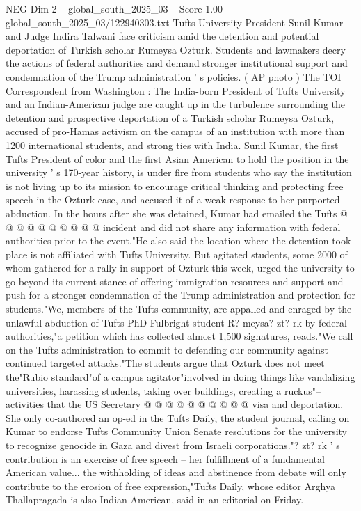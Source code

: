 \begin{textsample}{NEG Dim 2 – global\_south\_2025\_03 – Score 1.00 – global\_south\_2025\_03/122940303.txt}  \label{ex:f2_neg_140}
Tufts University President Sunil Kumar and Judge Indira Talwani face criticism amid the detention and potential deportation of Turkish scholar Rumeysa Ozturk.
Students and lawmakers decry the actions of federal authorities and demand stronger institutional support and condemnation of the Trump administration ' s policies. ( AP photo ) The TOI Correspondent from Washington : The India-born President of Tufts University and an Indian-American judge are caught up in the turbulence surrounding the detention and prospective deportation of a Turkish scholar Rumeysa Ozturk, accused of pro-Hamas activism on the campus of an institution with more than 1200 international students, and strong ties with India.
Sunil Kumar, the first Tufts President of color and the first Asian American to hold the position in the university ' s 170-year history, is under fire from students who say the institution is not living up to its mission to encourage critical thinking and protecting free speech in the Ozturk case, and accused it of a weak response to her purported abduction.
In the hours after she was detained, Kumar had emailed the Tufts @ @ @ @ @ @ @ @ @ @ incident and did not share any information with federal authorities prior to the event."He also said the location where the detention took place is not affiliated with Tufts University.
But agitated students, some 2000 of whom gathered for a rally in support of Ozturk this week, urged the university to go beyond its current stance of offering immigration resources and support and push for a stronger condemnation of the Trump administration and protection for students."We, members of the Tufts community, are appalled and enraged by the unlawful abduction of Tufts PhD Fulbright student R? meysa? zt? rk by federal authorities,"a petition which has collected almost 1,500 signatures, reads."We call on the Tufts administration to commit to defending our community against continued targeted attacks."The students argue that Ozturk does not meet the"Rubio standard"of a campus agitator"involved in doing things like vandalizing universities, harassing students, taking over buildings, creating a ruckus"-- activities that the US Secretary @ @ @ @ @ @ @ @ @ @ visa and deportation.
She only co-authored an op-ed in the Tufts Daily, the student journal, calling on Kumar to endorse Tufts Community Union Senate resolutions for the university to recognize genocide in Gaza and divest from Israeli corporations."? zt? rk ' s contribution is an exercise of free speech -- her fulfillment of a fundamental American value... the withholding of ideas and abstinence from debate will only contribute to the erosion of free expression,"Tufts Daily, whose editor Arghya Thallapragada is also Indian-American, said in an editorial on Friday.

\end{textsample}
